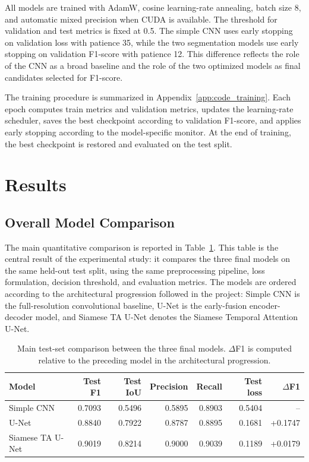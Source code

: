 \documentclass[11pt,a4paper]{article}
\begin{document}
All models are trained with AdamW, cosine learning-rate annealing, batch size 8, and automatic mixed precision when CUDA is available. The threshold for validation and test metrics is fixed at 0.5. The simple CNN uses early stopping on validation loss with patience 35, while the two segmentation models use early stopping on validation F1-score with patience 12. This difference reflects the role of the CNN as a broad baseline and the role of the two optimized models as final candidates selected for F1-score.

The training procedure is summarized in Appendix~\ref{app:code_training}. Each epoch computes train metrics and validation metrics, updates the learning-rate scheduler, saves the best checkpoint according to validation F1-score, and applies early stopping according to the model-specific monitor. At the end of training, the best checkpoint is restored and evaluated on the test split.

\clearpage
\section{Results}
\label{sec:results}

\subsection{Overall Model Comparison}

The main quantitative comparison is reported in Table~\ref{tab:final_results}. This table is the central result of the experimental study: it compares the three final models on the same held-out test split, using the same preprocessing pipeline, loss formulation, decision threshold, and evaluation metrics. The models are ordered according to the architectural progression followed in the project: Simple CNN is the full-resolution convolutional baseline, U-Net is the early-fusion encoder-decoder model, and Siamese TA U-Net denotes the Siamese Temporal Attention U-Net.

\begin{table}[H]
  \centering
  \small
  \caption{Main test-set comparison between the three final models. \(\Delta\)F1 is computed relative to the preceding model in the architectural progression.}
  \label{tab:final_results}
  \begin{tabular}{@{}lrrrrrr@{}}
    \toprule
    Model & Test F1 & Test IoU & Precision & Recall & Test loss & \(\Delta\)F1 \\
    \midrule
    Simple CNN & 0.7093 & 0.5496 & 0.5895 & 0.8903 & 0.5404 & -- \\
    U-Net & 0.8840 & 0.7922 & 0.8787 & 0.8895 & 0.1681 & +0.1747 \\
    Siamese TA U-Net & 0.9019 & 0.8214 & 0.9000 & 0.9039 & 0.1189 & +0.0179 \\
    \bottomrule
  \end{tabular}
\end{table}
\end{document}
